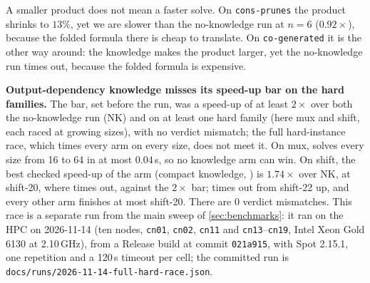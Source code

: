 A smaller product does not mean a faster solve.
On \texttt{cons-prunes} the product shrinks to $13\%$, yet we are slower than the no-knowledge run at $n = 6$ ($0.92\times$), because the folded formula there is cheap to translate.
On \texttt{co-generated} it is the other way around: the knowledge makes the product larger, yet the no-knowledge run times out, because the folded formula is expensive.

\textbf{Output-dependency knowledge misses its speed-up bar on the hard families.}
The bar, set before the run, was a speed-up of at least $2\times$ over both the no-knowledge run (NK) and  on at least one hard family (here mux and shift, each raced at growing sizes), with no verdict mismatch; the full hard-instance race, which times every arm on every size, does not meet it.
On mux,  solves every size from 16 to 64 in at most $0.04$\,s, so no knowledge arm can win.
On shift, the best checked speed-up of the  arm (compact knowledge, ) is $1.74\times$ over NK, at shift-20, where  times out, against the $2\times$ bar;  times out from shift-22 up, and every other arm finishes at most shift-20.
There are $0$ verdict mismatches.
This race is a separate run from the main sweep of \cref{sec:benchmarks}: it ran on the HPC on 2026-11-14 (ten nodes, \texttt{cn01}, \texttt{cn02}, \texttt{cn11} and \texttt{cn13}--\texttt{cn19}, Intel Xeon Gold 6130 at 2.10\,GHz), from a Release build at commit \texttt{021a915}, with Spot 2.15.1, one repetition and a 120\,s timeout per cell; the committed run is \texttt{docs/runs/2026-11-14-full-hard-race.json}.

